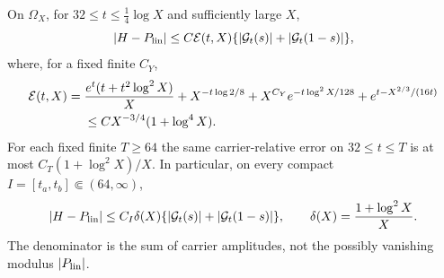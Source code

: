 \begin{proposition}
\label{prop:linear-field-budget}
On $\Omega_X$, for $32\le t\le\tfrac14\log X$ and sufficiently
large $X$,
\begin{equation}
 |H-P_{\rm lin}|\le C\mathcal E(t,X)
       \{ |\mathcal G_t(s)|+|\mathcal G_t(1-s)|\},
 \label{eq:linear-field-error}
\end{equation}
where, for a fixed finite $C_Y$,
\begin{align}
 \mathcal E(t,X)={}&\frac{e^t(t+t^2\log^2X)}X
       +X^{-t\log2/8}+X^{C_Y}e^{-t\log^2X/128}
       +e^{t-X^{2/3}/(16t)}\notag\\
 &\le C X^{-3/4}(1+\log^4X).
 \label{eq:linear-four-payments}
\end{align}
For each fixed finite $T\ge64$ the same carrier-relative error on
$32\le t\le T$ is at most $C_T(1+\log^2X)/X$.
In particular, on every compact $I=[t_a,t_b]\Subset(64,\infty)$,
\begin{equation}
 |H-P_{\rm lin}|\le C_I\delta(X)
       \{ |\mathcal G_t(s)|+|\mathcal G_t(1-s)|\},\qquad
 \delta(X)=\frac{1+\log^2X}{X}.
 \label{eq:linear-compact-field}
\end{equation}
The denominator is the sum of carrier amplitudes, not the possibly
vanishing modulus $|P_{\rm lin}|$.
\end{proposition}
